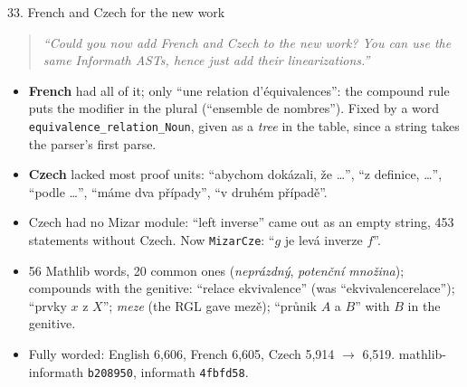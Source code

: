 \documentclass[10pt,aspectratio=169]{beamer}
\newcommand{\bad}[1]{\textcolor{warn}{#1}}
\newcommand{\ok}[1]{\textcolor{good}{#1}}
\newcommand{\commit}[1]{\texttt{\footnotesize #1}}
\newcommand{\prompt}[1]{\begin{quote}\small\itshape ``#1''\end{quote}}
\begin{document}
\begin{frame}{33. French and Czech for the new work}
  \footnotesize
  \prompt{Could you now add French and Czech to the new work? You can use the same Informath
  ASTs, hence just add their linearizations.}
  \begin{itemize}
    \item \textbf{French} had all of it; only ``une relation \bad{d'équivalences}'': the
          compound rule puts the modifier in the plural (``ensemble de nombres''). Fixed by a
          word \texttt{equivalence\_relation\_Noun}, given as a \emph{tree} in the table, since
          a string takes the parser's first parse.
    \item \textbf{Czech} lacked most proof units: ``abychom dokázali, že \ldots'', ``z definice,
          \ldots'', ``podle \ldots'', ``máme dva případy'', ``v druhém případě''.
    \item Czech had \bad{no Mizar module}: ``left inverse'' came out as an \bad{empty string},
          453 statements without Czech. Now \texttt{MizarCze}: ``$g$ je levá inverze $f$''.
    \item 56 Mathlib words, 20 common ones (\emph{neprázdný}, \emph{potenční množina}); compounds
          with the genitive: ``relace ekvivalence'' (was \bad{``ekvivalencerelace''}); ``prvky
          $x$ \ok{z} $X$''; \emph{meze} (the RGL gave \bad{mezě}); ``průnik $A$ a $B$'' with $B$
          in the genitive.
    \item Fully worded: English 6,606, French 6,605, Czech 5,914 $\to$ \ok{6,519}.
          mathlib-informath \commit{b208950}, informath \commit{4fbfd58}.
  \end{itemize}
\end{frame}
\end{document}
